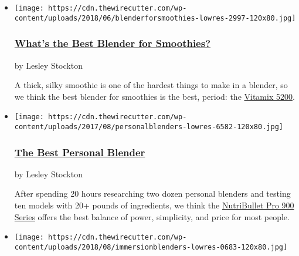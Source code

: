 \begin{itemize}
\item
  \href{https://www.nytimes3xbfgragh.onion/wirecutter/reviews/best-blender-for-smoothies/}{}

  \texttt{[image: https://cdn.thewirecutter.com/wp-content/uploads/2018/06/blenderforsmoothies-lowres-2997-120x80.jpg]}

  \hypertarget{whats-the-best-blender-for-smoothies}{%
  \subsubsection{\texorpdfstring{\href{https://www.nytimes3xbfgragh.onion/wirecutter/reviews/best-blender-for-smoothies/}{What's
  the Best Blender for
  Smoothies?}}{What's the Best Blender for Smoothies?}}\label{whats-the-best-blender-for-smoothies}}

  by Lesley Stockton

  A thick, silky smoothie is one of the hardest things to make in a
  blender, so we think the best blender for smoothies is the best,
  period: the
  \href{https://www.nytimes3xbfgragh.onion/wirecutter/out/link/7761/0/4/76626/}{Vitamix
  5200}.
\item
  \href{https://www.nytimes3xbfgragh.onion/wirecutter/reviews/best-personal-blender/}{}

  \texttt{[image: https://cdn.thewirecutter.com/wp-content/uploads/2017/08/personalblenders-lowres-6582-120x80.jpg]}

  \hypertarget{the-best-personal-blender}{%
  \subsubsection{\texorpdfstring{\href{https://www.nytimes3xbfgragh.onion/wirecutter/reviews/best-personal-blender/}{The
  Best Personal
  Blender}}{The Best Personal Blender}}\label{the-best-personal-blender}}

  by Lesley Stockton

  After spending 20 hours researching two dozen personal blenders and
  testing ten models with 20+ pounds of ingredients, we think the
  \href{https://www.nytimes3xbfgragh.onion/wirecutter/out/link/17375/162800/4/59216/?merchant=Nutribullet}{NutriBullet
  Pro 900 Series} offers the best balance of power, simplicity, and
  price for most people.
\item
  \href{https://www.nytimes3xbfgragh.onion/wirecutter/reviews/best-immersion-blender/}{}

  \texttt{[image: https://cdn.thewirecutter.com/wp-content/uploads/2018/08/immersionblenders-lowres-0683-120x80.jpg]}


\end{itemize}
